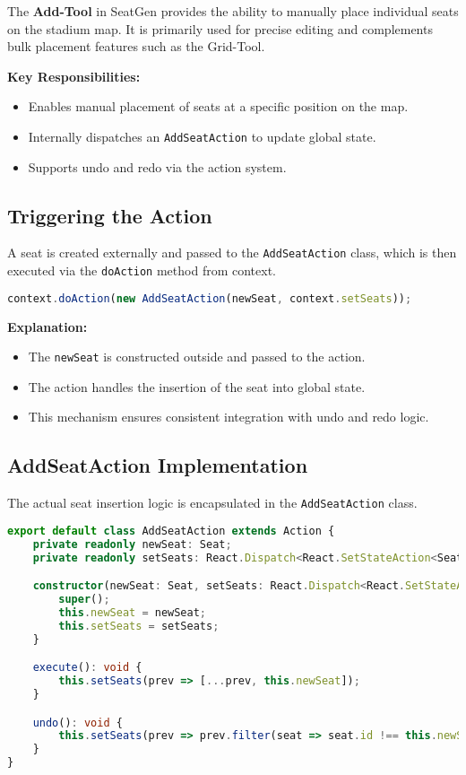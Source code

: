 The \textbf{Add-Tool} in SeatGen provides the ability to manually place individual seats on the stadium map. It is primarily used for precise editing and complements bulk placement features such as the Grid-Tool.

\textbf{Key Responsibilities:}
\begin{itemize}
    \item Enables manual placement of seats at a specific position on the map.
    \item Internally dispatches an \texttt{AddSeatAction} to update global state.
    \item Supports undo and redo via the action system.
\end{itemize}

\subsection{Triggering the Action}

A seat is created externally and passed to the \texttt{AddSeatAction} class, which is then executed via the \texttt{doAction} method from context.

\begin{lstlisting}[language=TypeScript, caption=Calling AddSeatAction, label=lst:add-tool-action-call]
context.doAction(new AddSeatAction(newSeat, context.setSeats));
\end{lstlisting}

\textbf{Explanation:}
\begin{itemize}
    \item The \texttt{newSeat} is constructed outside and passed to the action.
    \item The action handles the insertion of the seat into global state.
    \item This mechanism ensures consistent integration with undo and redo logic.
\end{itemize}

\subsection{AddSeatAction Implementation}

The actual seat insertion logic is encapsulated in the \texttt{AddSeatAction} class.

\begin{lstlisting}[language=TypeScript, caption=AddSeatAction Implementation, label=lst:add-seat-action]
export default class AddSeatAction extends Action {
    private readonly newSeat: Seat;
    private readonly setSeats: React.Dispatch<React.SetStateAction<Seat[]>>;

    constructor(newSeat: Seat, setSeats: React.Dispatch<React.SetStateAction<Seat[]>>) {
        super();
        this.newSeat = newSeat;
        this.setSeats = setSeats;
    }

    execute(): void {
        this.setSeats(prev => [...prev, this.newSeat]);
    }

    undo(): void {
        this.setSeats(prev => prev.filter(seat => seat.id !== this.newSeat.id));
    }
}
\end{lstlisting}

